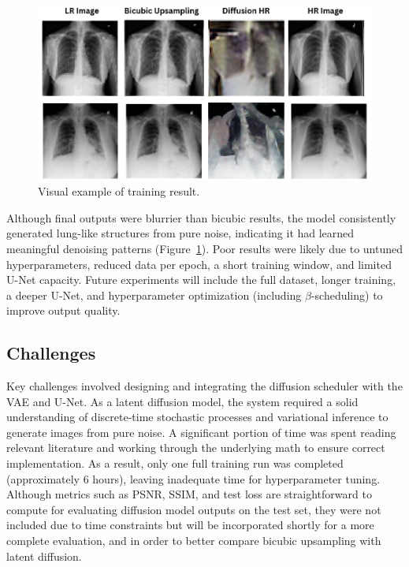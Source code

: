 \documentclass{article} %
\begin{document}
\begin{figure}[h]
\begin{center}
\includegraphics[width=1\textwidth]{progress/Figs/trainv1.png}
\end{center}
\caption{Visual example of training result.}
\label{v1}
\end{figure}

Although final outputs were blurrier than bicubic results, the model consistently generated lung-like structures from pure noise, indicating it had learned meaningful denoising patterns (Figure~\ref{v1}). Poor results were likely due to untuned hyperparameters, reduced data per epoch, a short training window, and limited U-Net capacity. Future experiments will include the full dataset, longer training, a deeper U-Net, and hyperparameter optimization (including $\beta$-scheduling) to improve output quality.

\subsection{Challenges}

Key challenges involved designing and integrating the diffusion scheduler with the VAE and U-Net. As a latent diffusion model, the system required a solid understanding of discrete-time stochastic processes and variational inference to generate images from pure noise. A significant portion of time was spent reading relevant literature and working through the underlying math to ensure correct implementation. As a result, only one full training run was completed (approximately 6 hours), leaving inadequate time for hyperparameter tuning. Although metrics such as PSNR, SSIM, and test loss are straightforward to compute for evaluating diffusion model outputs on the test set, they were not included due to time constraints but will be incorporated shortly for a more complete evaluation, and in order to better compare bicubic upsampling with latent diffusion.

\clearpage

\label{last_page}



\end{document}
